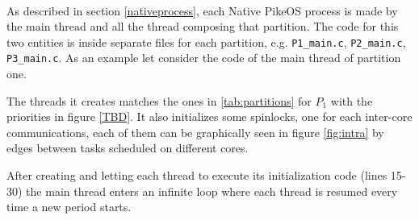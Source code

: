 \paragraph{} As described in section \ref{nativeprocess}, each Native PikeOS process is made by the main thread and all the thread composing that partition. The code for this two entities is inside separate files for each partition, e.g. \verb|P1_main.c|, \verb|P2_main.c|, \verb|P3_main.c|. As an example let consider the code of the main thread of partition one.

The threads it creates matches the ones in \ref{tab:partitions} for $P_1$ with the priorities in figure \ref{TBD}. It also initializes some spinlocks, one for each inter-core communications, each of them can be graphically seen in figure \ref{fig:intra} by edges between tasks scheduled on different cores.
\par After creating and letting each thread to execute its initialization code (lines 15-30) the main thread enters an infinite loop where each thread is resumed every time a new period starts.


